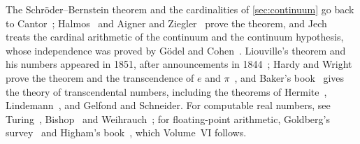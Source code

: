 The Schr\"oder--Bernstein theorem and the cardinalities of \cref{sec:continuum} go back to Cantor~\cite{cantor1874,cantor1878}; Halmos~\cite{halmos1960naive} and Aigner and Ziegler~\cite{aigner2018proofs} prove the theorem, and Jech~\cite{jech2003} treats the cardinal arithmetic of the continuum and the continuum hypothesis, whose independence was proved by G\"odel and Cohen~\cite{godel1940,cohen1963,cohen1964}. Liouville's theorem and his numbers appeared in 1851, after announcements in 1844~\cite{liouville1851}; Hardy and Wright prove the theorem and the transcendence of $e$ and $\pi$~\cite{hardywright2008}, and Baker's book~\cite{baker1975} gives the theory of transcendental numbers, including the theorems of Hermite~\cite{hermite1873}, Lindemann~\cite{lindemann1882}, and Gelfond and Schneider. For computable real numbers, see Turing~\cite{turing1936}, Bishop~\cite{bishop1967} and Weihrauch~\cite{weihrauch2000}; for floating-point arithmetic, Goldberg's survey~\cite{goldberg1991} and Higham's book~\cite{higham2002accuracy}, which Volume~VI follows.

\chapterreferences
